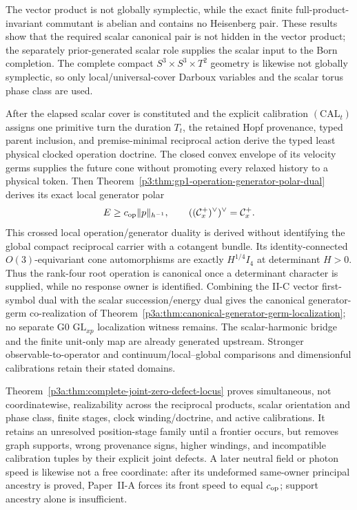\documentclass[12pt,a4paper]{article}
\begin{document}
The vector product is not globally symplectic, while the exact finite
full-product-invariant commutant is abelian and contains no Heisenberg pair.
These results show that the required scalar canonical pair is not hidden in the
vector product; the separately prior-generated scalar role supplies the scalar
input to the Born completion.  The complete compact
$S^3\times S^3\times T^2$ geometry is likewise not globally symplectic, so
only local/universal-cover Darboux variables and the scalar torus phase class
are used.

After the elapsed scalar cover is constituted and the explicit calibration
\((\mathrm{CAL}_{t})\) assigns one primitive turn the duration \(T_t\), the
retained Hopf provenance, typed parent
inclusion, and premise-minimal reciprocal action derive the typed least
physical clocked operation doctrine.  The closed convex envelope of its
velocity germs supplies the future cone without promoting every relaxed
history to a physical token.  Then
Theorem~\ref{p3:thm:gp1-operation-generator-polar-dual} derives its exact
local generator polar
\[
   E\ge c_{\rm op}\|p\|_{h^{-1}},
   \qquad ((\mathcal C_x^+)^\vee)^\vee=\mathcal C_x^+.
\]
This crossed local operation/generator duality is derived without identifying
the global compact reciprocal carrier with a cotangent bundle.  Its
identity-connected \(O(3)\)-equivariant cone automorphisms are exactly
\(H^{1/4}I_4\) at determinant \(H>0\).  Thus the rank-four root operation is
canonical once a determinant character is supplied, while no response owner
is identified.  Combining the
II-C vector first-symbol dual with the scalar succession/energy dual gives the
canonical generator-germ co-realization of
Theorem~\ref{p3a:thm:canonical-generator-germ-localization}; no separate G0
\(\mathrm{GL}_{xp}\) localization witness remains.  The scalar-harmonic bridge and the finite unit-only map are already
generated upstream. Stronger observable-to-operator and continuum/local--global
comparisons and dimensionful calibrations retain their stated domains.

Theorem~\ref{p3a:thm:complete-joint-zero-defect-locus} proves simultaneous,
not coordinatewise, realizability across the reciprocal products, scalar
orientation and phase class, finite stages, clock winding/doctrine, and active
calibrations.  It retains an unresolved position-stage family until a frontier
occurs, but removes graph supports, wrong provenance signs, higher windings,
and incompatible calibration tuples by their explicit joint defects.  A later
neutral field or photon speed is likewise not a free coordinate: after its
undeformed same-owner principal ancestry is proved, Paper~II-A forces its
front speed to equal \(c_{\rm op}\); support ancestry alone is insufficient.
\end{document}
